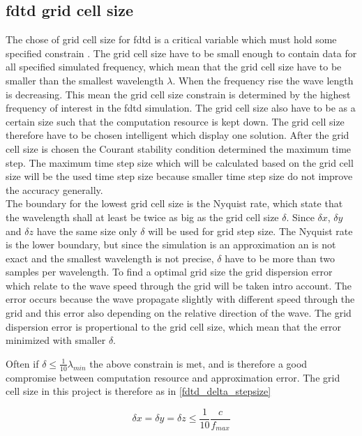 \subsection{\gls{fdtd} grid cell size}

The chose of grid cell size for \gls{fdtd} is a critical variable which must hold some specified constrain \citep{Kunz1993}. The grid cell size have to be small enough to contain data for all specified simulated frequency, which mean that the grid cell size have to be smaller than the smallest wavelength $\lambda$. When the frequency rise the wave length is decreasing. This mean the grid cell size constrain is determined by the highest frequency of interest in the \gls{fdtd} simulation. The grid cell size also have to be as a certain size such that the computation resource is kept down. The grid cell size therefore have to be chosen intelligent which \citep{Kunz1993} display one solution. After the grid cell size is chosen the Courant stability condition determined the maximum time step. The maximum time step size which will be calculated based on the grid cell size will be the used time step size because smaller time step size do not improve the accuracy generally. \\


The boundary for the lowest grid cell size is the Nyquist rate, which state that the wavelength shall at least be twice as big as the grid cell size $\delta$. Since $\delta x$, $\delta y$ and $\delta z$ have the same size only $\delta$ will be used for grid step size. The Nyquist rate is the lower boundary, but since the simulation is an approximation an is not exact and the smallest wavelength is not precise, $\delta$ have to be more than two samples per wavelength. To find a optimal grid size the grid dispersion error which relate to the wave speed through the grid will be taken intro account. The error occurs because the wave propagate slightly with different speed through the grid and this error also depending on the relative direction of the wave. The grid dispersion error is propertional to the grid cell size, which mean that the error minimized with smaller $\delta$\citep{Kunz1993}. 

Often if $ \delta \leq \frac{1}{10}\lambda_{min}$ the above constrain is met, and is therefore a good compromise between computation resource and approximation error. The grid cell size in this project is therefore as in \autoref{fdtd_delta_stepsize}

\begin{equation}\label{fdtd_delta_stepsize}
\delta x = \delta y = \delta z \leq \frac{1}{10} \frac{c}{f_{max}}
\end{equation}

